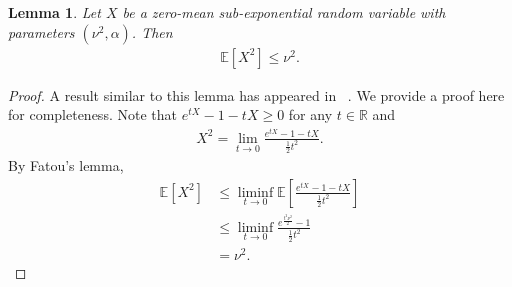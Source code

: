 \documentclass[11pt,twoside]{article}
\numberwithin{equation}{section}
\newcommand{\EE}{\mathbb{E}}
\newcommand{\RR}{\mathbb{R}}
\newcommand{\1}{\mathbf{1}}
\newtheorem{lemma}[theorem]{Lemma}
\theoremstyle{remark}
\theoremstyle{plain}
\begin{document}
\begin{lemma}\label{lem:second_moment_sub_exponential}
	Let $X$ be a zero-mean sub-exponential random variable with parameters $(\nu^2, \alpha)$. Then
	\begin{align*}
		\EE[X^2] \le \nu^2.
	\end{align*}
\end{lemma}
\begin{proof}
	A result similar to this lemma has appeared in ~\cite[Exercise 2.5]{wainwright2019high}. We provide a proof here for completeness. Note that $e^{tX} -1 - tX \ge 0$ for any $t \in \RR$ and 
	\begin{align*}
		X^2 = \lim_{t \rightarrow 0} \frac{e^{tX} - 1 - tX}{\frac{1}{2}t^2}.
	\end{align*}
	By Fatou's lemma,
	\begin{align*}
		\EE[X^2] &\le \liminf_{t \rightarrow 0} \EE\left[\frac{e^{tX} - 1 - tX}{\frac{1}{2}t^2}\right] \\
		&\le  \liminf_{t \rightarrow 0} \frac{e^{\frac{t^2\nu^2}{2}} -1}{\frac{1}{2}t^2}\\
		&= \nu^2.
	\end{align*}
\end{proof}
\end{document}
